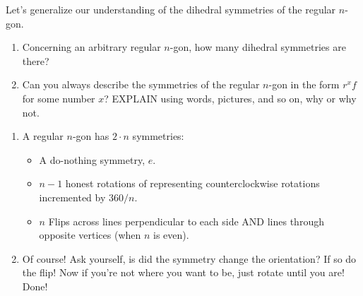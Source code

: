 \documentclass[noauthor,nooutcomes,12pt,hints,handout]{ximera}
\begin{document}
\begin{question}
  Let's generalize our understanding of the dihedral symmetries of the
  regular $n$-gon.
  \begin{enumerate}
  \item Concerning an arbitrary regular $n$-gon, how many dihedral symmetries
    are there?
  \item Can you always describe the symmetries of the regular $n$-gon
    in the form $r^xf$ for some number $x$? EXPLAIN using words,
    pictures, and so on, why or why not.
  \end{enumerate}
  \begin{freeResponse}
    \begin{enumerate}
    \item A regular $n$-gon has $2\cdot n$ symmetries:
      \begin{itemize}
      \item A do-nothing symmetry, $e$.
      \item $n-1$ honest rotations of representing counterclockwise rotations incremented by $360/n$.
      \item $n$ Flips across lines perpendicular to each side AND
        lines through opposite vertices (when $n$ is even).
      \end{itemize}
    \item Of course! Ask yourself, is did the symmetry change the
      orientation? If so do the flip! Now if you're not where you
      want to be, just rotate until you are! Done!
    \end{enumerate}
  \end{freeResponse}
\end{question}
\mynewpage
\end{document}
